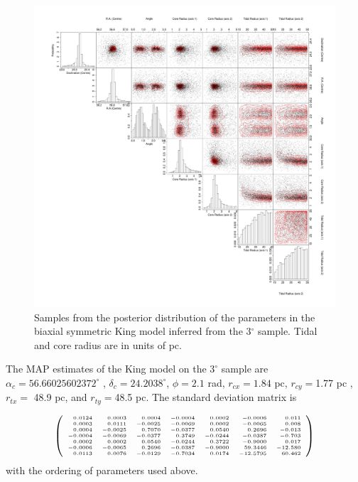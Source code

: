 \begin{figure}[H]
 \centering
  \includegraphics[width=\textwidth]{background/Figures/PSD/KingEll7.pdf}
  \caption{Samples from the posterior distribution of the parameters in the biaxial symmetric King model inferred from the 3$^{\circ}$ sample. Tidal and core radius are in units of pc.}
\label{fig:KingEll7}
\end {figure}

The MAP estimates of the King model on the $3^{\circ}$ sample are $\alpha_c=56.66025602372^{\circ}$ , $\delta_c=24.2038 ^{\circ}$, $\phi=2.1$ rad, $r_{cx}=1.84$ pc, $r_{cy}=$1.77 pc ,$r_{tx}=$ 48.9 pc, and $r_{ty}=$48.5 pc. The standard deviation matrix is

$$
\tiny
\left(\begin{array}{rrrrrrr}
 0.0124 & 0.0003 & 0.0004 &-0.0004 & 0.0002 & -0.0006 &  0.011\\
 0.0003 & 0.0111 &-0.0025 &-0.0069 & 0.0002 & -0.0065 &  0.008\\
 0.0004 &-0.0025 & 0.7070 &-0.0377 & 0.0540 &  0.2696 & -0.013\\
-0.0004 &-0.0069 &-0.0377 & 0.3749 &-0.0244 & -0.0387 & -0.703\\
 0.0002 & 0.0002 & 0.0540 &-0.0244 & 0.3722 & -0.9000 &  0.017\\
-0.0006 &-0.0065 & 0.2696 &-0.0387 &-0.9000 & 59.3446 &-12.580\\
 0.0113 & 0.0076 &-0.0129 &-0.7034 & 0.0174 &-12.5795 & 60.462\\
\end{array}\right)
$$
with the ordering of parameters used above.

